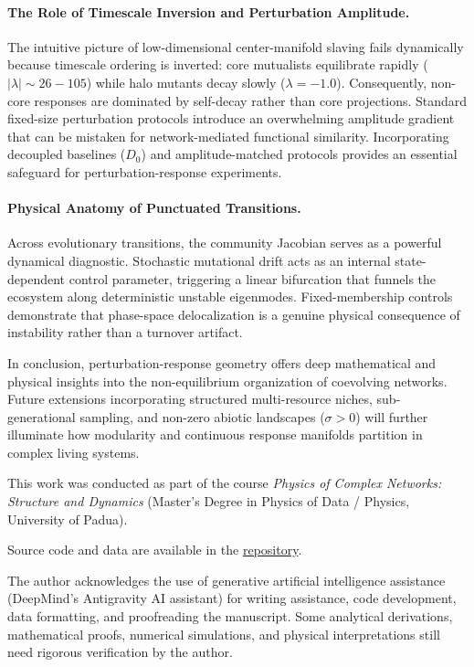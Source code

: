 \documentclass[twocolumn,amsmath,amssymb,aps,pra,10pt,floatfix,nofootinbib]{revtex4-2}
\begin{document}
\paragraph{The Role of Timescale Inversion and Perturbation Amplitude.} The intuitive picture of low-dimensional center-manifold slaving fails dynamically because timescale ordering is inverted: core mutualists equilibrate rapidly ($|\lambda| \sim 26 - 105$) while halo mutants decay slowly ($\lambda = -1.0$). Consequently, non-core responses are dominated by self-decay rather than core projections. Standard fixed-size perturbation protocols introduce an overwhelming amplitude gradient that can be mistaken for network-mediated functional similarity. Incorporating decoupled baselines ($D_0$) and amplitude-matched protocols provides an essential safeguard for perturbation-response experiments.

\paragraph{Physical Anatomy of Punctuated Transitions.} Across evolutionary transitions, the community Jacobian serves as a powerful dynamical diagnostic. Stochastic mutational drift acts as an internal state-dependent control parameter, triggering a linear bifurcation that funnels the ecosystem along deterministic unstable eigenmodes. Fixed-membership controls demonstrate that phase-space delocalization is a genuine physical consequence of instability rather than a turnover artifact.

In conclusion, perturbation-response geometry offers deep mathematical and physical insights into the non-equilibrium organization of coevolving networks. Future extensions incorporating structured multi-resource niches, sub-generational sampling, and non-zero abiotic landscapes ($\sigma > 0$) will further illuminate how modularity and continuous response manifolds partition in complex living systems.

\begin{acknowledgments}
This work was conducted as part of the course \emph{Physics of Complex Networks: Structure and Dynamics} (Master's Degree in Physics of Data / Physics, University of Padua).

Source code and data are available in the \href{https://github.com/filippobezzi/PoCN_projects}{repository}. 

The author acknowledges the use of generative artificial intelligence assistance (DeepMind's Antigravity AI assistant) for writing assistance, code development, data formatting, and proofreading the manuscript. Some analytical derivations, mathematical proofs, numerical simulations, and physical interpretations still need rigorous verification by the author.

\end{acknowledgments}


\end{document}
